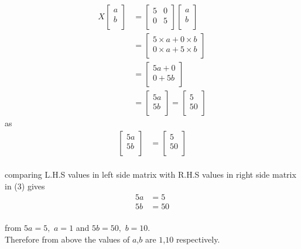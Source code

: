 \documentclass[journal, 11pt,twocolumn]{IEEEtran}
\begin{document}
    \begin{align}
  X\begin{bmatrix}
  a\\
  b\\
  \end{bmatrix} & = \begin{bmatrix}
  5 & 0\\
  0 & 5\\
  \end{bmatrix}
 \begin{bmatrix}
 a\\
 b\\
 \end{bmatrix}
 \nonumber\\
                            & = \begin{bmatrix}
                            5 \times a + 0 \times b\\
                            0 \times a + 5 \times b\\
                            \end{bmatrix}
                            \nonumber\\
                            & = \begin{bmatrix}
                            5a+0\\
                            0+5b\\
                            \end{bmatrix}
                            \nonumber\\
                            & = \begin{bmatrix}
                            5a\\
                            5b\\
                            \end{bmatrix} = \begin{bmatrix}
                            5\\
                            50\\
                            \end{bmatrix}
                            \end{align}as \begin{align}
                            \begin{bmatrix}
        5a\\
        5b\\
        \end{bmatrix} & = \begin{bmatrix}
        5\\
        50\\
        \end{bmatrix}
        \nonumber
        \end{align}\\
        
       comparing L.H.S values in left side matrix with R.H.S values in right side matrix in (3) gives
\begin{align}
5a & = 5\nonumber\\
5b & = 50\nonumber
\end{align}\\
from $5a=5,$ $a = 1$ and $5b=50,$ $b=10.$\\
Therefore from above the values of $a$,$b$ are $1$,$10$ respectively.
   
\end{document}
